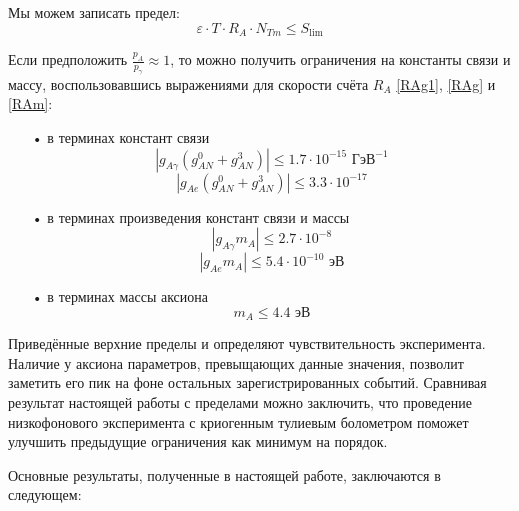 \documentclass[a4paper,article,14pt]{extarticle}
\begin{document}
Мы можем записать предел:
\begin{equation}
   \varepsilon  \cdot T \cdot {R_A} \cdot N_{Tm} \leqslant {S_{\lim }}
\end{equation}

Если предположить $\frac{{{p_A}}}{{{p_\gamma}}} \approx 1$, то можно получить ограничения на константы связи и массу, воспользовавшись выражениями для скорости счёта ${R_A}$ \eqref{RAg1}, \eqref{RAg} и \eqref{RAm}:

\begin{enumerate}
    \item[•] в терминах констант связи
    \begin{equation}
         \left| g_{A\gamma}{\left( {g_{AN}^0 + g_{AN}^3} \right)} \right| \leqslant 1.7 \cdot 10^{-15} \text{ ГэВ}^{-1}
    \end{equation}
    \begin{equation}
         \left| g_{Ae}{\left( {g_{AN}^0 + g_{AN}^3} \right)} \right| \leqslant 3.3 \cdot 10^{-17}
    \end{equation}
    \item[•] в терминах произведения констант связи и массы
    \begin{equation}
        \left| {{g_{A\gamma}}{m_A}} \right| \leqslant 2.7 \cdot 10^{-8}
    \end{equation}
    \begin{equation}
        \left| {{g_{Ae}}{m_A}} \right| \leqslant 5.4 \cdot 10^{-10} \text{ эВ}
    \end{equation}
    \item[•] в терминах массы аксиона
    \begin{equation}
        m_A \leqslant 4.4 \text{ эВ}
    \end{equation}
\end{enumerate}

Приведённые верхние пределы и определяют чувствительность эксперимента. Наличие у аксиона параметров, превыщающих данные значения, позволит заметить его пик на фоне остальных зарегистрированных событий. Сравнивая результат настоящей работы с пределами \cite{newlimits_tm} можно заключить, что проведение низкофонового эксперимента с криогенным тулиевым болометром поможет улучшить предыдущие ограничения как минимум на порядок.

Основные результаты, полученные в настоящей работе, заключаются в следующем:
\end{document}
